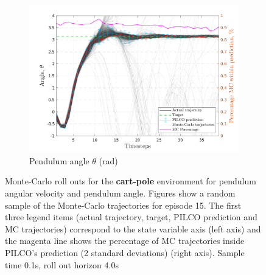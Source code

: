\begin{figure}[H]
  \begin{subfigure}[b]{1\linewidth}
    \centering
    \includegraphics[height=0.4\textheight,width=1\textwidth]{Chapter3/Figures/cp_MC_rollout_Ep_15_Dim_4.png} 
    \caption{Pendulum angle $\theta$ (rad)} 
    \label{Fig:Re-cp-pen-angle} 
  \end{subfigure} 
\caption[Monte-Carlo roll outs for \textbf{cart-pole} pendulum angular velocity and pendulum angle]{Monte-Carlo roll outs for the \textbf{cart-pole} environment for pendulum angular velocity and pendulum angle. Figures show a random sample of the Monte-Carlo trajectories for episode 15. The first three legend items (actual trajectory, target, PILCO prediction and MC trajectories) correspond to the state variable axis (left axis) and the magenta line shows the percentage of MC trajectories inside PILCO's prediction (2 standard deviations) (right axis). Sample time 0.1s, roll out horizon 4.0s}
\label{Fig:Re-cp-MC-roll-outs-2} 
\end{figure}
 
